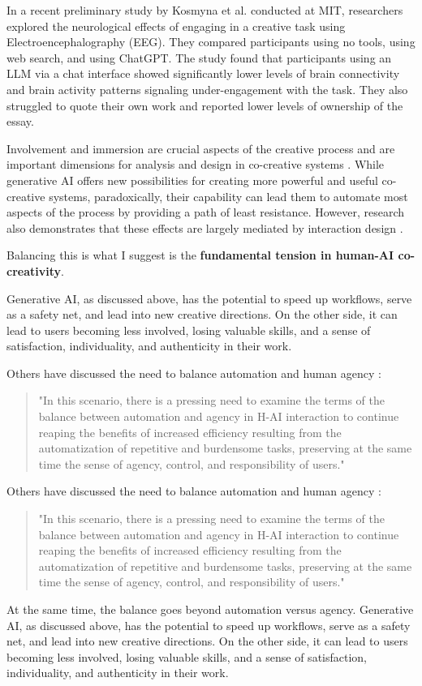 In a recent preliminary study by Kosmyna et al. \cite{Kosmyna2025-cm} conducted at MIT, researchers explored the neurological effects of engaging in a creative task using Electroencephalography (EEG). They compared participants using no tools, using web search, and using ChatGPT. The study found that participants using an LLM via a chat interface showed significantly lower levels of brain connectivity and brain activity patterns signaling under-engagement with the task. They also struggled to quote their own work and reported lower levels of ownership of the essay.

Involvement and immersion are crucial aspects of the creative process \cite{Amabile1996-pt, Csikszentmihalyi1997-ui} and are important dimensions for analysis and design in co-creative systems \cite{Davis2016-te, Cherry2014-ty, Rezwana2022-ui, Clark2018-yf, Lawton2023-gd, Yuan2022-kb, Li2024-yh, Kantosalo2015-pk, Resnick2005-fs}. While generative AI offers new possibilities for creating more powerful and useful co-creative systems, paradoxically, their capability can lead them to automate most aspects of the process by providing a path of least resistance.
However, research also demonstrates that these effects are largely mediated by interaction design \cite{Kim2023-wt, Essel2024-qc}.

Balancing this is what I suggest is the \textbf{fundamental tension in human-AI co-creativity}.

Generative AI, as discussed above, has the potential to speed up workflows, serve as a safety net, and lead into new creative directions. On the other side, it can lead to users becoming less involved, losing valuable skills, and a sense of satisfaction, individuality, and authenticity in their work.

Others have discussed the need to balance automation and human agency \cite{Moruzzi2024-cq}:
\begin{quote}
    "In this scenario, there is a pressing need to examine the terms of the balance between automation and agency in H-AI interaction to continue reaping the benefits of increased efficiency resulting from the automatization of repetitive and burdensome tasks, preserving at the same time the sense of agency, control, and responsibility of users."
\end{quote}

Others have discussed the need to balance automation and human agency \cite{Moruzzi2024-cq}:
\begin{quote}
    "In this scenario, there is a pressing need to examine the terms of the balance between automation and agency in H-AI interaction to continue reaping the benefits of increased efficiency resulting from the automatization of repetitive and burdensome tasks, preserving at the same time the sense of agency, control, and responsibility of users."
\end{quote}
At the same time, the balance goes beyond automation versus agency. Generative AI, as discussed above, has the potential to speed up workflows, serve as a safety net, and lead into new creative directions. On the other side, it can lead to users becoming less involved, losing valuable skills, and a sense of satisfaction, individuality, and authenticity in their work.


